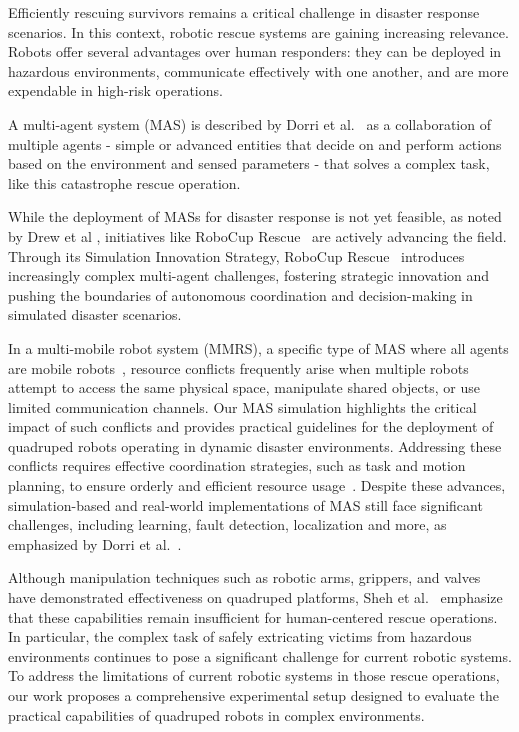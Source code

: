 \documentclass[a4paper,twoside]{article}
\begin{document}
Efficiently rescuing survivors remains a critical challenge in disaster response scenarios. In this context, robotic rescue systems are gaining increasing relevance. Robots offer several advantages over human responders: they can be deployed in hazardous environments, communicate effectively with one another, and are more expendable in high-risk operations.

A multi-agent system (MAS) is described by Dorri et al.\ \cite{Dorri2018Multi} as a collaboration of multiple agents - simple or advanced entities that decide on and perform actions based on the environment and sensed parameters - that solves a complex task, like this catastrophe rescue operation.

While the deployment of MASs for disaster response is not yet feasible, as noted by Drew et al \cite{Drew2021Multi}, initiatives like RoboCup Rescue\ \cite{robocuprescue2025} are actively advancing the field. Through its Simulation Innovation Strategy, RoboCup Rescue\ \cite{Visser2015RoboCup} introduces increasingly complex multi-agent challenges, fostering strategic innovation and pushing the boundaries of autonomous coordination and decision-making in simulated disaster scenarios. 

In a multi-mobile robot system (MMRS), a specific type of MAS where all agents are mobile robots\ \cite{yan2013survey}, resource conflicts frequently arise when multiple robots attempt to access the same physical space, manipulate shared objects, or use limited communication channels. 
Our MAS simulation highlights the critical impact of such conflicts and provides practical guidelines for the deployment of quadruped robots operating in dynamic disaster environments.
Addressing these conflicts requires effective coordination strategies, such as task and motion planning, to ensure orderly and efficient resource usage\ \cite{yan2013survey,Parker2016multiple}.
Despite these advances, simulation-based and real-world implementations of MAS still face significant challenges, including learning, fault detection, localization and more, as emphasized by Dorri et al.\ \cite{Dorri2018Multi}.

Although manipulation techniques such as robotic arms, grippers, and valves have demonstrated effectiveness on quadruped platforms, Sheh et al.\ \cite{Sheh2016RoboCup} emphasize that these capabilities remain insufficient for human-centered rescue operations. In particular, the complex task of safely extricating victims from hazardous environments continues to pose a significant challenge for current robotic systems. To address the limitations of current robotic systems in those rescue operations, our work proposes a comprehensive experimental setup designed to evaluate the practical capabilities of quadruped robots in complex environments.
\end{document}
